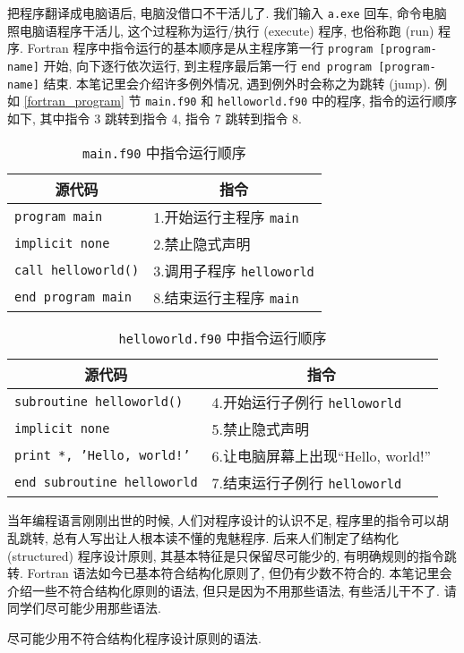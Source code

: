 把程序翻译成电脑语后, 电脑没借口不干活儿了. 我们输入 \texttt{a.exe} 回车, 命令电脑照电脑语程序干活儿, 这个过程称为运行/执行 (execute) 程序, 也俗称跑 (run) 程序. Fortran 程序中指令运行的基本顺序是从主程序第一行 \texttt{program [program-name]} 开始, 向下逐行依次运行, 到主程序最后第一行 \texttt{end program [program-name]} 结束. 本笔记里会介绍许多例外情况, 遇到例外时会称之为跳转 (jump). 例如 \ref{fortran_program} 节 \texttt{main.f90} 和 \texttt{helloworld.f90} 中的程序, 指令的运行顺序如下, 其中指令 3 跳转到指令 4, 指令 7 跳转到指令 8.
\begin{table}[!htbp]
    \centering
    \begin{tabular}{|p{}|p{}|}
        \hline
        \multicolumn{1}{|c|}{源代码}&\multicolumn{1}{|c|}{指令}\\
        \hline
        \texttt{program main}&1.开始运行主程序 \texttt{main}\\
        \hline
        \texttt{implicit none}&2.禁止隐式声明\\
        \hline
        \texttt{call helloworld()}&3.调用子程序 \texttt{helloworld}\\
        \hline
        \texttt{end program main}&8.结束运行主程序 \texttt{main}\\
        \hline
    \end{tabular}
    \caption{\texttt{main.f90} 中指令运行顺序}
\end{table}
\begin{table}[!htbp]
    \centering
    \begin{tabular}{|p{}|p{}|}
        \hline
        \multicolumn{1}{|c|}{源代码}&\multicolumn{1}{|c|}{指令}\\
        \hline
        \texttt{subroutine helloworld()}&4.开始运行子例行 \texttt{helloworld}\\
        \hline
        \texttt{implicit none}&5.禁止隐式声明\\
        \hline
        \texttt{print *, 'Hello, world!'}&6.让电脑屏幕上出现``Hello, world!''\\
        \hline
        \texttt{end subroutine helloworld}&7.结束运行子例行 \texttt{helloworld}\\
        \hline
    \end{tabular}
    \caption{\texttt{helloworld.f90} 中指令运行顺序}
\end{table}

当年编程语言刚刚出世的时候, 人们对程序设计的认识不足, 程序里的指令可以胡乱跳转, 总有人写出让人根本读不懂的鬼魅程序. 后来人们制定了结构化 (structured) 程序设计原则, 其基本特征是只保留尽可能少的, 有明确规则的指令跳转. Fortran 语法如今已基本符合结构化原则了, 但仍有少数不符合的. 本笔记里会介绍一些不符合结构化原则的语法, 但只是因为不用那些语法, 有些活儿干不了. 请同学们尽可能少用那些语法.
\begin{convention}
    尽可能少用不符合结构化程序设计原则的语法.\label{no_no_structured}
\end{convention}

